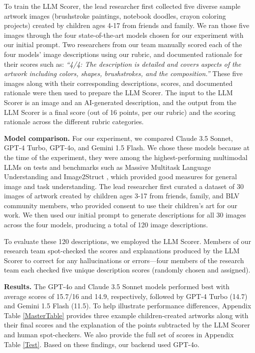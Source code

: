\documentclass[sigconf]{acmart}
\begin{document}
To train the LLM Scorer, the lead researcher first collected five diverse sample artwork images (brushstroke paintings, notebook doodles, crayon coloring projects) created by children ages 4-17 from friends and family. We ran those five images through the four state-of-the-art models chosen for our experiment with our initial prompt. Two researchers from our team manually scored each of the four models' image descriptions using our rubric, and documented rationale for their scores such as: \textit{``4/4: The description is detailed and covers aspects of the artwork including colors, shapes, brushstrokes, and the composition.''} These five images along with their corresponding descriptions, scores, and documented rationale were then used to prepare the LLM Scorer. The input to the LLM Scorer is an image and an AI-generated description, and the output from the LLM Scorer is a final score (out of 16 points, per our rubric) and the scoring rationale across the different rubric categories.

\textbf{Model comparison.}
For our experiment, we compared Claude 3.5 Sonnet, GPT-4 Turbo, GPT-4o, and Gemini 1.5 Flash. We chose these models because at the time of the experiment, they were among the highest-performing multimodal LLMs on tests and benchmarks such as Massive Multitask Language Understanding and Image2Struct \cite{(HELM), HELM_MMLU}, which provided good measures for general image and task understanding. The lead researcher first curated a dataset of 30 images of artwork created by children ages 3-17 from friends, family, and BLV community members, who provided consent to use their children's art for our work. We then used our initial prompt to generate descriptions for all 30 images across the four models, producing a total of 120 image descriptions.

To evaluate these 120 descriptions, we employed the LLM Scorer. Members of our research team spot-checked the scores and explanations produced by the LLM Scorer to correct for any hallucinations or errors---four members of the research team each checked five unique description scores (randomly chosen and assigned).

\textbf{Results.}
The GPT-4o and Claude 3.5 Sonnet models performed best with average scores of 15.7/16 and 14.9, respectively, followed by GPT-4 Turbo (14.7) and Gemini 1.5 Flash (11.5). To help illustrate performance differences, Appendix Table \ref{MasterTable} provides three example children-created artworks along with their final scores and the explanation of the points subtracted by the LLM Scorer and human spot-checkers. We also provide the full set of scores in Appendix Table \ref{Test}. Based on these findings, our backend used GPT-4o.
\end{document}
